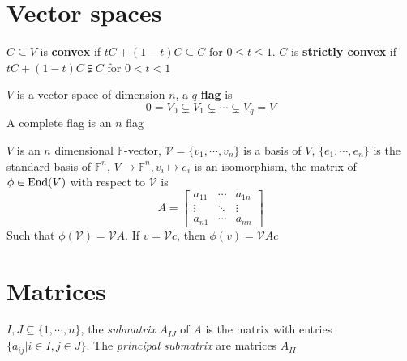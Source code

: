 \documentclass[main]{subfiles}
\begin{document}
\tableofcontents
\newpage

\section{Vector spaces}

\begin{definition}
$C\subseteq V$ is \textbf{convex} if $tC+(1-t)C\subseteq C$ for $0\leq t\leq1$. $C$ is \textbf{strictly convex} if $tC+(1-t)C\subsetneqq C$ for $0< t<1$
\end{definition}

\begin{definition}
$V$ is a vector space of dimension $n$, a $q$ \textbf{flag} is
\[0=V_0\subsetneq V_1\subsetneq\cdots\subsetneq V_q=V\]
A complete flag is an $n$ flag
\end{definition}

\begin{definition}
$V$ is an $n$ dimensional $\mathbb F$-vector, $\mathcal V=\{v_1,\cdots, v_n\}$ is a basis of $V$, $\{e_1,\cdots,e_n\}$ is the standard basis of $\mathbb F^n$, $V\to\mathbb F^n,v_i\mapsto e_i$ is an isomorphism, the matrix of $\phi\in\operatorname{End}(V)$ with respect to $\mathcal V$ is
\[A=
\begin{bmatrix}
a_{11}&\cdots&a_{1n} \\
\vdots&\ddots&\vdots \\
a_{n1}&\cdots&a_{nn}
\end{bmatrix}
\]
Such that $\phi(\mathcal V)=\mathcal VA$. If $v=\mathcal Vc$, then $\phi(v)=\mathcal VAc$
\end{definition}



\section{Matrices}

\begin{definition}
$I,J\subseteq\{1,\cdots,n\}$, the \textit{submatrix} $A_{IJ}$ of $A$ is the matrix with entries $\{a_{ij}|i\in I,j\in J\}$. The \textit{principal submatrix} are matrices $A_{II}$
\end{definition}
\end{document}
